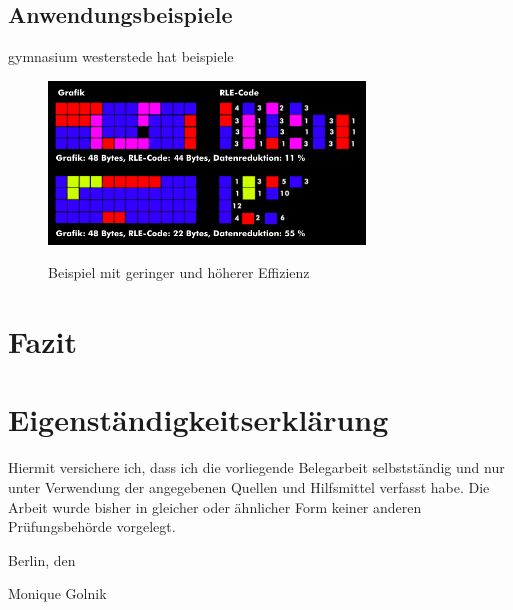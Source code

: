 \documentclass[11pt,a4paper,ngerman]{report}
\begin{document}
		
		\section{Anwendungsbeispiele}
		gymnasium westerstede hat beispiele
		
		
		  \begin{figure} [H]
			\begin{center}
				\includegraphics[width=0.75\textwidth]{g_h_Effizienz.png}
				\caption{Beispiel mit geringer und höherer Effizienz}
				\cite{ITWissen.info}
				\label{Effizienz}
			\end{center}
		\end{figure}
		
		
	
	\chapter{Fazit}
	
	\chapter{Eigenständigkeitserklärung}
	
	Hiermit versichere ich, dass ich die vorliegende Belegarbeit selbstständig und nur unter
	Verwendung der angegebenen Quellen und Hilfsmittel verfasst habe. Die Arbeit wurde bisher
	in gleicher oder ähnlicher Form keiner anderen Prüfungsbehörde vorgelegt.
	
	\vskip 1cm
	
	Berlin, den \date{\today}
	
	\vskip 1.5cm
	
	Monique Golnik
	
		
	\listoffigures
	
	
	\printbibliography[heading=bibintoc, keyword={online}, title={Onlinequellen}]\clearpage
	\printbibliography[heading=bibintoc, keyword={image}, title={Bildquellen}]\clearpage
	
\end{document}
